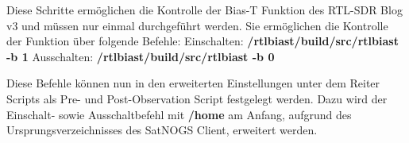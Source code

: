 Diese Schritte ermöglichen die Kontrolle der Bias-T Funktion des RTL-SDR Blog v3 und müssen nur einmal durchgeführt werden. Sie ermöglichen die Kontrolle der Funktion über folgende Befehle:
\newline Einschalten: \textbf{/rtl\textunderscore biast/build/src/rtl\textunderscore biast -b 1}
\newline Ausschalten: \textbf{/rtl\textunderscore biast/build/src/rtl\textunderscore biast -b 0}

Diese Befehle können nun in den erweiterten Einstellungen unter dem Reiter Scripts als Pre- und Post-Observation Script festgelegt werden. Dazu wird der Einschalt- sowie Ausschaltbefehl mit \textbf{/home} am Anfang, aufgrund des Ursprungsverzeichnisses des SatNOGS Client, erweitert werden.